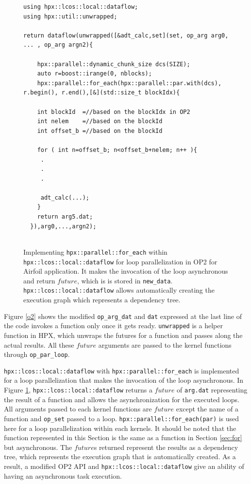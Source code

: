 \documentclass[conference]{IEEEtran}
\begin{document}
\begin{figure}
    \begin{lstlisting}    
using hpx::lcos::local::dataflow;
using hpx::util::unwrapped;    

return dataflow(unwrapped([&adt_calc,set](set, op_arg arg0, ... , op_arg argn2){

    hpx::parallel::dynamic_chunk_size dcs(SIZE);
    auto r=boost::irange(0, nblocks);
    hpx::parallel::for_each(hpx::parallel::par.with(dcs), r.begin(), r.end(),[&](std::size_t blockIdx){
  
    int blockId  =//based on the blockIdx in OP2
    int nelem    =//based on the blockId 
    int offset_b =//based on the blockId
        
    for ( int n=offset_b; n<offset_b+nelem; n++ ){
     .
     .
     .

     adt_calc(...);
    }
    return arg5.dat;
  }),arg0,...,argn2);
  
    \end{lstlisting}
    \caption{\small{Implementing \texttt{hpx::parallel::for\_each} within \texttt{hpx::lcos::local::dataflow} for loop parallelization in OP2 for Airfoil application. It makes the invocation of the loop asynchronous and return $future$, which is is stored in \texttt{new\_data}. \texttt{hpx::lcos::local::dataflow} allows automatically creating the execution graph which represents a dependency tree.}}
    \label{l3b}
\end{figure}



Figure \ref{o2} shows the modified \texttt{op\_arg\_dat} and \texttt{dat} expressed at the last line of the code invokes a function only once it gets ready. \texttt{unwrapped} is a helper function in HPX, which unwraps the futures for a function and passes along the actual results. All these $future$ arguments are passed to the kernel functions through \texttt{op\_par\_loop}.



\texttt{hpx::lcos::local::dataflow} with \texttt{hpx::parallel::for\_each} is implemented for a loop parallelization that makes the invocation of the loop asynchronous. In Figure \ref{l3b}, \texttt{hpx::lcos::local::dataflow} returns a $future$ of \texttt{arg.dat} representing the result of a function and allows the asynchronization for the executed loops. All arguments passed to each kernel functions are $future$ except the name of a function and \texttt{op\_set} passed to a loop. \texttt{hpx::parallel::for\_each(par)} is used here for a loop parallelization within each kernels. It should be noted that the function represented in this Section is the same as a function in Section \ref{sec:for} but asynchronous. The $future$s returned represent the results as a dependency tree, which represents the execution graph that is automatically created. As a result, a modified OP2 API and \texttt{hpx::lcos::local::dataflow} give an ability of having an asynchronous task execution. 
\end{document}
